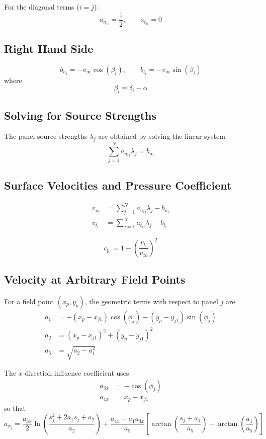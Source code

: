 For the diagonal terms ($i = j$):
\[
    a_{n_{ii}} = \frac{1}{2}, \qquad a_{t_{ii}} = 0
\]

\subsection{Right Hand Side}
\label{subsec:right_hand_side}

\[
    b_{n_i} = -v_\infty \cos(\beta_i), \qquad b_{t_i} = -v_\infty \sin(\beta_i)
\]
where
\[
    \beta_i = \delta_i - \alpha
\]

\subsection{Solving for Source Strengths}
\label{subsec:solving_for_source_strengths}

The panel source strengths $\lambda_j$ are obtained by solving the linear system
\[
    \sum_{j=1}^{N} a_{n_{ij}} \lambda_j = b_{n_i}
\]

\subsection{Surface Velocities and Pressure Coefficient}
\label{subsec:surface_velocities_and_pressure_coefficient}

\begin{align*}
    v_{n_i} &= \sum_{j=1}^{N} a_{n_{ij}} \lambda_j - b_{n_i} \\
    v_{t_i} &= \sum_{j=1}^{N} a_{t_{ij}} \lambda_j - b_{t_i}
\end{align*}

\[
    c_{p_i} = 1 - \left(\frac{v_{t_i}}{v_\infty}\right)^2
\]

\subsection{Velocity at Arbitrary Field Points}
\label{subsec:velocity_at_arbitrary_field_points}

For a field point $(x_p, y_p)$, the geometric terms with respect to panel $j$ are
\begin{align*}
    a_1 &= -(x_p - x_{j1})\cos(\phi_j) - (y_p - y_{j1})\sin(\phi_j) \\
    a_2 &= (x_p - x_{j1})^2 + (y_p - y_{j1})^2 \\
    a_5 &= \sqrt{a_2 - a_1^2}
\end{align*}

The $x$-direction influence coefficient uses
\begin{align*}
    a_{3x} &= -\cos(\phi_j) \\
    a_{4x} &= x_p - x_{j1}
\end{align*}
so that
\[
    a_{x_{j}} = \frac{a_{3x}}{2} \ln\!\left(\frac{s_j^2 + 2 a_1 s_j + a_2}{a_2}\right) + \frac{a_{4x} - a_1 a_{3x}}{a_5}\left[\arctan\!\left(\frac{s_j + a_1}{a_5}\right) - \arctan\!\left(\frac{a_1}{a_5}\right)\right]
\]


